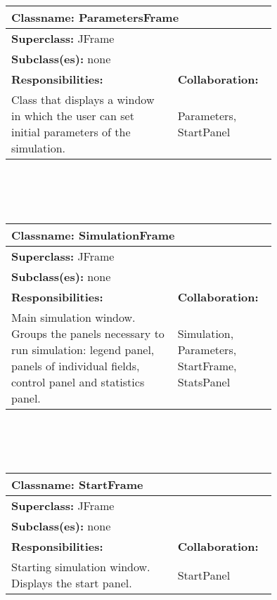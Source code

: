 \documentclass{article}
\begin{document}
\\ \\ \\
\begin{tabular}{|p{0.55\linewidth}|p{0.2\linewidth}|}
\hline
\multicolumn{2}{|l|}{\textbf{Classname:} ParametersFrame} \\
\hline
\multicolumn{2}{|l|}{\textbf{Superclass:} JFrame} \\
\multicolumn{2}{|l|}{\textbf{Subclass(es):} none} \\
\hline
\textbf{Responsibilities:}  &  \textbf{Collaboration:} \\
Class that displays a window in which the user can set initial parameters of the simulation. & Parameters, StartPanel \\
\hline
\end{tabular}
\\ \\ \\
\begin{tabular}{|p{0.55\linewidth}|p{0.2\linewidth}|}
\hline
\multicolumn{2}{|l|}{\textbf{Classname:} SimulationFrame} \\
\hline
\multicolumn{2}{|l|}{\textbf{Superclass:} JFrame} \\
\multicolumn{2}{|l|}{\textbf{Subclass(es):} none} \\
\hline
\textbf{Responsibilities:}  &  \textbf{Collaboration:} \\
Main simulation window. Groups the panels necessary to run simulation: legend panel, panels of individual fields, control panel and statistics panel. & Simulation, Parameters, StartFrame, StatsPanel \\
\hline
\end{tabular}
\\ \\ \\
\begin{tabular}{|p{0.55\linewidth}|p{0.2\linewidth}|}
\hline
\multicolumn{2}{|l|}{\textbf{Classname:} StartFrame} \\
\hline
\multicolumn{2}{|l|}{\textbf{Superclass:} JFrame} \\
\multicolumn{2}{|l|}{\textbf{Subclass(es):} none} \\
\hline
\textbf{Responsibilities:}  &  \textbf{Collaboration:} \\
Starting simulation window. Displays the start panel. & StartPanel \\
\hline
\end{tabular}
\\ \\ \\
\end{document}
